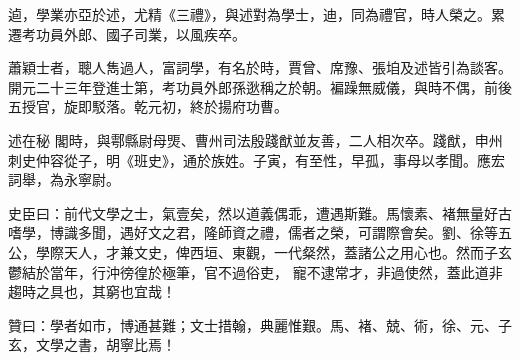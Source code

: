 \begin{pinyinscope}
 逌，學業亦亞於述，尤精《三禮》，與述對為學士，迪，同為禮官，時人榮之。累遷考功員外郎、國子司業，以風疾卒。



 蕭穎士者，聰人雋過人，富詞學，有名於時，賈曾、席豫、張垍及述皆引為談客。開元二十三年登進士第，考功員外郎孫逖稱之於朝。褊躁無威儀，與時不偶，前後五授官，旋即駁落。乾元初，終於揚府功曹。



 述在秘
 閣時，與鄠縣尉母煚、曹州司法殷踐猷並友善，二人相次卒。踐猷，申州刺史仲容從子，明《班史》，通於族姓。子寅，有至性，早孤，事母以孝聞。應宏詞舉，為永寧尉。



 史臣曰：前代文學之士，氣壹矣，然以道義偶乖，遭遇斯難。馬懷素、褚無量好古嗜學，博識多聞，遇好文之君，隆師資之禮，儒者之榮，可謂際會矣。劉、徐等五公，學際天人，才兼文史，俾西垣、東觀，一代粲然，蓋諸公之用心也。然而子玄鬱結於當年，行沖徬徨於極筆，官不過俗吏，
 寵不逮常才，非過使然，蓋此道非趨時之具也，其窮也宜哉！



 贊曰：學者如市，博通甚難；文士措翰，典麗惟艱。馬、褚、兢、術，徐、元、子玄，文學之書，胡寧比焉！



\end{pinyinscope}